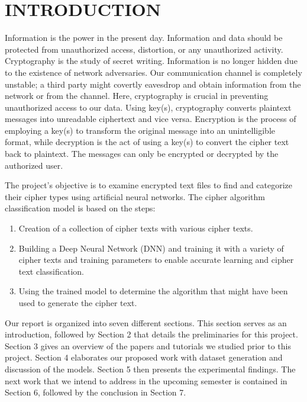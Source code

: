 \documentclass[a4paper]{article}
\begin{document}
\setcounter{page}{1}
\newpage
\setcounter{tocdepth}{2} %
\tableofcontents
{}
\newpage

\setcounter{page}{1}

\section{INTRODUCTION}
Information is the power in the present day. 
Information and data should be protected from 
unauthorized access, distortion, or any 
unauthorized activity. Cryptography is the study of secret writing. 
Information is no longer hidden due to the existence of network 
adversaries. Our communication channel is completely unstable; a 
third party might covertly eavesdrop and obtain information from 
the network or from the channel. Here, cryptography is crucial 
in preventing unauthorized access to our data. Using key(s), 
cryptography converts plaintext messages into unreadable ciphertext 
and vice versa. Encryption is the process of employing a key(s) 
to transform the original message into an unintelligible format, 
while decryption is the act of using a key(s) to convert the 
cipher text back to plaintext. The messages can only be encrypted 
or decrypted by the authorized user.

The project's objective is to examine encrypted text files to 
find and categorize their cipher types using artificial neural 
networks. The cipher algorithm classification model is based 
on the steps: 
\begin{enumerate}
    \item   Creation of a collection of cipher texts with various cipher texts.
    \item   Building a Deep Neural Network (DNN) and training 
            it with a variety of cipher texts and training parameters 
            to enable accurate learning and cipher text classification. 
    \item   Using the trained model to determine the algorithm 
            that might have been used to generate the cipher text. 
\end{enumerate}

Our report is organized into seven different sections. This section serves as 
an introduction, followed by Section 2 that details the preliminaries for this 
project. Section 3 gives an overview of the papers and tutorials we studied 
prior to this project.  Section 4 elaborates our proposed work with dataset 
generation and discussion of the models. Section 5 then presents 
the experimental findings. The next work that we intend to address in the 
upcoming semester is contained in Section 6, followed by the conclusion in 
Section 7.
\end{document}
